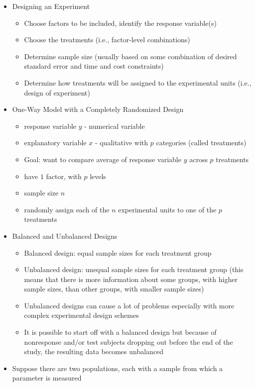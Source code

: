 \documentclass[12pt]{article}
\begin{document}
\begin{itemize}
\item Designing an Experiment \begin{itemize} 
\item Choose factors to be included, identify the response variable(s)
\item Choose the treatments (i.e., factor-level combinations)
\item Determine sample size (usually based on some combination of desired standard error and time and cost constraints)
\item Determine how treatments will be assigned to the experimental units (i.e., design of experiment) \end{itemize} 
\item One-Way Model with a Completely Randomized Design \begin{itemize} 
\item response variable $y$ - numerical variable 
\item explanatory variable $x$ - qualitative with $p$ categories (called treatments)
\item Goal: want to compare average of response variable $y$ across $p$ treatments 
\item have $1$ factor, with $p$ levels 
\item sample size $n$ 
\item randomly assign each of the $n$ experimental units to one of the $p$ treatments \end{itemize} 
\item Balanced and Unbalanced Designs \begin{itemize} 
\item Balanced design: equal sample sizes for each treatment group
\item Unbalanced design: unequal sample sizes for each treatment group (this means that there is more information about some  groups, with higher sample sizes, than other groups, with smaller sample sizes)
\item Unbalanced designs can cause a lot of problems especially with more complex experimental design schemes
\item It is possible to start off with a balanced design but because of nonresponse and/or test subjects dropping out before the end of the study, the resulting data becomes unbalanced \end{itemize} 
\item Suppose there are two populations, each with a sample from which a parameter is measured \begin{itemize} 

\end{itemize}
\end{itemize}
\end{document}
